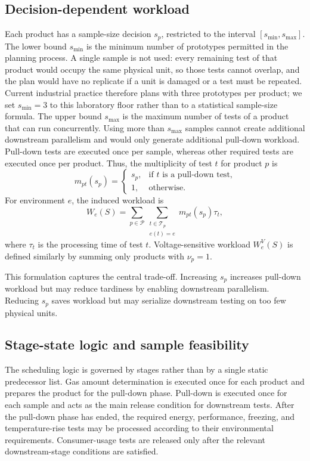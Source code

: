 \documentclass[11pt]{article}
\begin{document}
\subsection{Decision-dependent workload}
\label{subsec:workload}

Each product has a sample-size decision \(s_p\), restricted to the interval \([s_{\min},s_{\max}]\). The lower bound \(s_{\min}\) is the minimum number of prototypes permitted in the planning process. A single sample is not used: every remaining test of that product would occupy the same physical unit, so those tests cannot overlap, and the plan would have no replicate if a unit is damaged or a test must be repeated. Current industrial practice therefore plans with three prototypes per product; we set \(s_{\min}=3\) to this laboratory floor rather than to a statistical sample-size formula. The upper bound \(s_{\max}\) is the maximum number of tests of a product that can run concurrently. Using more than \(s_{\max}\) samples cannot create additional downstream parallelism and would only generate additional pull-down workload. Pull-down tests are executed once per sample, whereas other required tests are executed once per product. Thus, the multiplicity of test \(t\) for product \(p\) is
\[
m_{pt}(s_p)=
\begin{cases}
s_p, & \text{if }t\text{ is a pull-down test,}\\
1, & \text{otherwise.}
\end{cases}
\]
For environment \(e\), the induced workload is
\[
W_e(S)=
\sum_{p\in\mathcal{P}}
\sum_{\substack{t\in\mathcal{T}_p\\e(t)=e}}
m_{pt}(s_p)\tau_t,
\]
where \(\tau_t\) is the processing time of test \(t\). Voltage-sensitive workload \(W_e^V(S)\) is defined similarly by summing only products with \(\nu_p=1\).

This formulation captures the central trade-off. Increasing \(s_p\) increases pull-down workload but may reduce tardiness by enabling downstream parallelism. Reducing \(s_p\) saves workload but may serialize downstream testing on too few physical units.

\subsection{Stage-state logic and sample feasibility}
\label{subsec:stage_logic}

The scheduling logic is governed by stages rather than by a single static predecessor list. Gas amount determination is executed once for each product and prepares the product for the pull-down phase. Pull-down is executed once for each sample and acts as the main release condition for downstream tests. After the pull-down phase has ended, the required energy, performance, freezing, and temperature-rise tests may be processed according to their environmental requirements. Consumer-usage tests are released only after the relevant downstream-stage conditions are satisfied.
\end{document}
